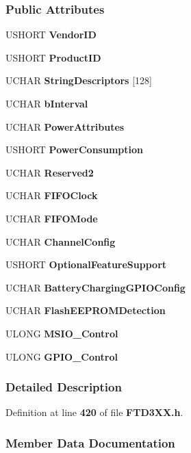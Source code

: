 \subsubsection*{Public Attributes}
\begin{DoxyCompactItemize}
\item 
U\+S\+H\+O\+RT {\bf Vendor\+ID}
\item 
U\+S\+H\+O\+RT {\bf Product\+ID}
\item 
U\+C\+H\+AR {\bf String\+Descriptors} [128]
\item 
U\+C\+H\+AR {\bf b\+Interval}
\item 
U\+C\+H\+AR {\bf Power\+Attributes}
\item 
U\+S\+H\+O\+RT {\bf Power\+Consumption}
\item 
U\+C\+H\+AR {\bf Reserved2}
\item 
U\+C\+H\+AR {\bf F\+I\+F\+O\+Clock}
\item 
U\+C\+H\+AR {\bf F\+I\+F\+O\+Mode}
\item 
U\+C\+H\+AR {\bf Channel\+Config}
\item 
U\+S\+H\+O\+RT {\bf Optional\+Feature\+Support}
\item 
U\+C\+H\+AR {\bf Battery\+Charging\+G\+P\+I\+O\+Config}
\item 
U\+C\+H\+AR {\bf Flash\+E\+E\+P\+R\+O\+M\+Detection}
\item 
U\+L\+O\+NG {\bf M\+S\+I\+O\+\_\+\+Control}
\item 
U\+L\+O\+NG {\bf G\+P\+I\+O\+\_\+\+Control}
\end{DoxyCompactItemize}


\subsubsection{Detailed Description}


Definition at line {\bf 420} of file {\bf F\+T\+D3\+X\+X.\+h}.



\subsubsection{Member Data Documentation}
